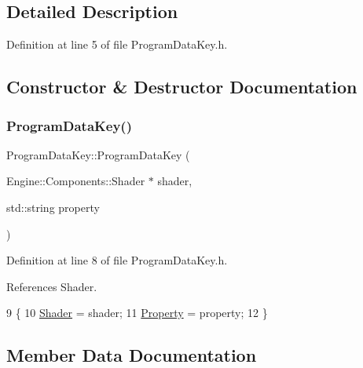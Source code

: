 \subsection{Detailed Description}


Definition at line 5 of file Program\+Data\+Key.\+h.



\subsection{Constructor \& Destructor Documentation}
\mbox{\label{classProgramDataKey_ab2378434a42d81c34f97912197ad9a8d}} 
\subsubsection{\texorpdfstring{Program\+Data\+Key()}{ProgramDataKey()}}
{\footnotesize\ttfamily Program\+Data\+Key\+::\+Program\+Data\+Key (\begin{DoxyParamCaption}\item[{Engine\+::\+Components\+::\+Shader $\ast$}]{shader,  }\item[{std\+::string}]{property }\end{DoxyParamCaption})\hspace{0.3cm}{\ttfamily [inline]}}



Definition at line 8 of file Program\+Data\+Key.\+h.



References Shader.


\begin{DoxyCode}
9     \{
10         \mbox{\hyperlink{classProgramDataKey_ac8797a9070abe91cea6ad8615d60fa90}{Shader}} = shader;
11         \mbox{\hyperlink{classProperty}{Property}} = property;
12     \}
\end{DoxyCode}


\subsection{Member Data Documentation}
\mbox{\label{classProgramDataKey_a34706c7a5f763c8ecb8b5b1d70b41226}} 
